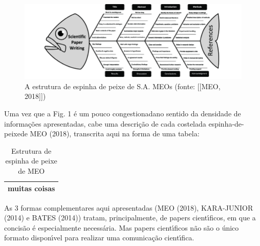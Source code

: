 \documentclass[
12pt,		%
openright,	%
twoside,  %
a4paper,			%
chapter=TITLE,		%
english,			%
french,				%
spanish,			%
brazil				%
]{USPSC-classe/USPSC_RedarTex}
\begin{document}
\captionsetup{format=plain}
\begin{figure}[Htb]

	\begin{center}

		\includegraphics[max size={\textwidth}]{../../imagens/MEOS.png}

	\end{center}

	\caption{\label{8372664f308c109a87f368fec1da024e1ad7d562}A estrutura de espinha de peixe de S.A. MEOs  (fonte: [[MEO, 2018]])}

\end{figure}

Uma vez que a Fig. 1 \'e um pouco \textquotedbl congestionada\textquotedbl  no sentido da densidade de informa\c{c}\~oes apresentadas, cabe uma descri\c{c}\~ao de cada \textquotedbl costela\textquotedbl  da \textquotedbl espinha-de-peixe\textquotedbl  de MEO (2018), transcrita aqui na forma de uma tabela:












\begin{table}[Htb]
\tiny
\caption{\label{404d3407ceff6ff9d0cc5a71368147d571c7f79a}Estrutura de espinha de peixe de MEO}

\centering
\begin{tabular}{|c|}
\hline
muitas coisas \\\hline

\end{tabular}
\end{table}


As 3 formas complementares aqui apresentadas (MEO (2018),  KARA-JUNIOR (2014) e BATES (2014)) tratam, principalmente, de papers cient\'{\i}ficos, em que a concis\~ao \'e especialmente necess\'aria. Mas papers cient\'{\i}ficos n\~ao s\~ao o \'unico formato dispon\'{\i}vel para realizar uma comunica\c{c}\~ao cient\'{\i}fica.
\end{document}

